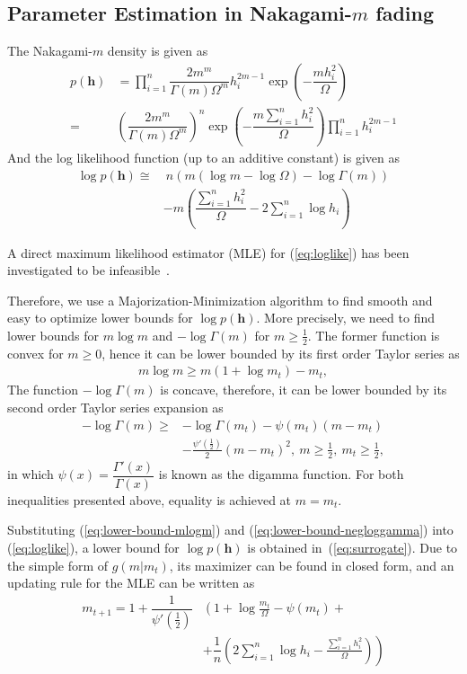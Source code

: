 \documentclass[conference, 10pt]{IEEEtran}
\begin{document}
\subsection{Parameter Estimation in Nakagami-$m$ fading}
The Nakagami-$m$ density is given as
\begin{align}
    p(\bm{h})& = \prod_{i=1}^{n}\dfrac{2m^m}{\Gamma(m)\Omega^{m}}h_i^{2m - 1}
              \exp\left(-\dfrac{mh_i^2}{\Omega}\right) \nonumber \\
          = & \left(\dfrac{2m^m}{\Gamma(m)\Omega^{m}}\right)^{n}
          \exp\left(-\dfrac{m\sum_{i=1}^{n}h_i^2}{\Omega}\right) \prod_{i=1}^{n}h_i^{2m - 1}
\end{align}
And the log likelihood function (up to an additive constant) is given as
\begin{align}
\log p(\bm{h}) \cong &~n\left(m\left(\log m - \log\Omega\right) - \log\Gamma(m)\right)\nonumber
    \\ & -m\left(\dfrac{\sum_{i=1}^{n}h_i^2}{\Omega} - 2\sum_{i=1}^{n}\log h_i\right)
    \label{eq:loglike}
\end{align}

A direct maximum likelihood estimator (MLE) for (\ref{eq:loglike}) has been
investigated to be infeasible~\cite{paper}.

Therefore, we use a Majorization-Minimization algorithm to find smooth
and easy to optimize lower bounds for $\log p(\bm{h})$. More precisely,
we need to find lower bounds for $m\log m$ and $-\log \Gamma(m)$ for $m \geq \frac{1}{2}$.
The former function is convex for $m \geq 0$, hence it can be lower bounded
by its first order Taylor series as
\begin{align}
    m \log m \geq m(1 + \log m_t) - m_t,
    \label{eq:lower-bound-mlogm}
\end{align}
The function $-\log \Gamma(m)$ is concave, therefore, it can be lower bounded
by its second order Taylor series expansion as
\begin{align}
    -\log \Gamma(m) \geq& - \log \Gamma(m_t) - \psi(m_t) (m - m_t)\nonumber\\
                        & - \frac{\psi'\left(\frac{1}{2}\right)}{2}(m - m_t) ^ 2,
                        ~m \geq \frac{1}{2},~m_t \geq \frac{1}{2},
    \label{eq:lower-bound-negloggamma}
\end{align}
in which $\psi(x) = \dfrac{\Gamma'(x)}{\Gamma(x)}$ is known as the digamma function.
For both inequalities presented above, equality is achieved at $m = m_t$.

Substituting (\ref{eq:lower-bound-mlogm}) and (\ref{eq:lower-bound-negloggamma}) into
(\ref{eq:loglike}), a lower bound for $\log p(\bm{h})$ is obtained in~(\ref{eq:surrogate}).
Due to the simple form of $g(m | m_t)$, its maximizer can be found in closed form, and
an updating rule for the MLE can be written as
\begin{align}
    m_{t+1} = 1 + \dfrac{1}{\psi'(\frac{1}{2})}&\left(1 + \log \frac{m_t}{\Omega} - \psi(m_t)
    + \right.\nonumber\\
    &+ \left.\dfrac{1}{n} \left(2\sum_{i=1}^{n}\log h_i - \frac{\sum_{i=1}^{n}h_i^2}{\Omega}\right)\right)
\end{align}
\end{document}
